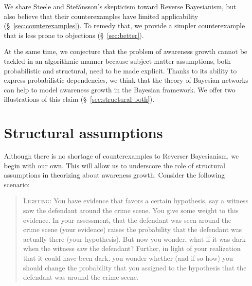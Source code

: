 \documentclass[
  11pt,
  dvipsnames,enabledeprecatedfontcommands]{scrartcl}
\begin{document}
We share Steele and Stefánsson's skepticism toward Reverse Bayesianism,
but also believe that their counterexamples have limited applicability
(\S ~\ref{sec:counterexamples}). To remedy that, we provide a simpler
counterexample that is less prone to objections (\S ~\ref{sec:better}).

At the same time, we conjecture that the problem of awareness growth
cannot be tackled in an algorithmic manner because subject-matter
assumptions, both probabilistic and structural, need to be made
explicit. Thanks to its ability to express probabilistic dependencies,
we think that the theory of Bayesian networks can help to model
awareness growth in the Bayesian framework. We offer two illustrations
of this claim (\S~\ref{sec:structural-both}).

\hypertarget{structural-assumptions}{%
\section{Structural assumptions}\label{structural-assumptions}}

\label{sec:structural-both}

Although there is no shortage of counterexamples to Reverser
Bayesianism, we begin with our own. This will allow us to underscore the
role of structural assumptions in theorizing about awareness growth.
Consider the following scenario:

\begin{quote}
\textsc{Lighting:} You have evidence that favors a certain hypothesis, say a witness 
saw the defendant around the crime scene. You give some weight to this evidence. 
In your assessment, that the defendant was seen around the crime scene (your evidence) raises the probability that the defendant was actually there (your hypothesis). But now you wonder, what if it was dark when the witness saw the defendant? Further, in light of your realization that it could have been dark, you wonder whether (and if so how) you should change the probability that you assigned to the hypothesis that the defendant was around the crime scene.
\end{quote}
\end{document}
